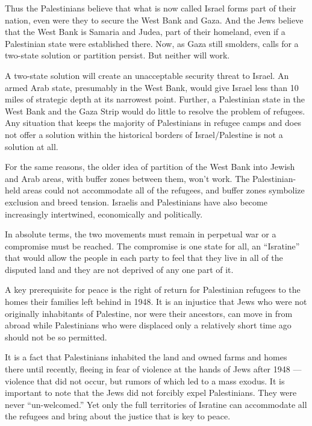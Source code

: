 Thus the Palestinians believe that what is now called Israel forms part
of their nation, even were they to secure the West Bank and Gaza. And
the Jews believe that the West Bank is Samaria and Judea, part of their
homeland, even if a Palestinian state were established there. Now, as
Gaza still smolders, calls for a two-state solution or partition
persist. But neither will work.

A two-state solution will create an unacceptable security threat to
Israel. An armed Arab state, presumably in the West Bank, would give
Israel less than 10 miles of strategic depth at its narrowest point.
Further, a Palestinian state in the West Bank and the Gaza Strip would
do little to resolve the problem of refugees. Any situation that keeps
the majority of Palestinians in refugee camps and does not offer a
solution within the historical borders of Israel/Palestine is not a
solution at all.

For the same reasons, the older idea of partition of the West Bank into
Jewish and Arab areas, with buffer zones between them, won't work. The
Palestinian-held areas could not accommodate all of the refugees, and
buffer zones symbolize exclusion and breed tension. Israelis and
Palestinians have also become increasingly intertwined, economically and
politically.

In absolute terms, the two movements must remain in perpetual war or a
compromise must be reached. The compromise is one state for all, an
``Isratine'' that would allow the people in each party to feel that they
live in all of the disputed land and they are not deprived of any one
part of it.

A key prerequisite for peace is the right of return for Palestinian
refugees to the homes their families left behind in 1948. It is an
injustice that Jews who were not originally inhabitants of Palestine,
nor were their ancestors, can move in from abroad while Palestinians who
were displaced only a relatively short time ago should not be so
permitted.

It is a fact that Palestinians inhabited the land and owned farms and
homes there until recently, fleeing in fear of violence at the hands of
Jews after 1948 --- violence that did not occur, but rumors of which led
to a mass exodus. It is important to note that the Jews did not forcibly
expel Palestinians. They were never ``un-welcomed.'' Yet only the full
territories of Isratine can accommodate all the refugees and bring about
the justice that is key to peace.

